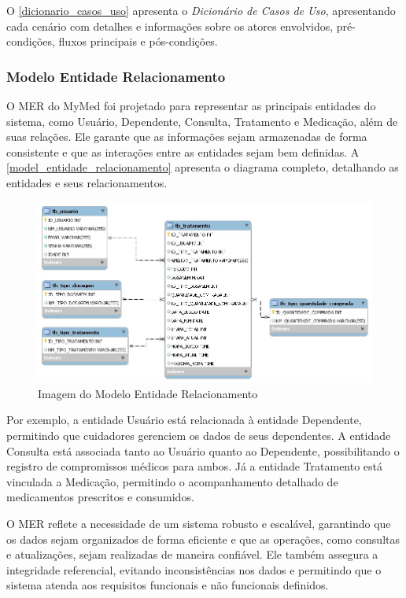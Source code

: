 \documentclass[
	article,			%
	12pt,				%
	oneside,			%
	a4paper,			%
    BIBLATEX,           %
	english,			%
	brazil,				%
	sumario=tradicional
	]{abntex2}
\begin{document}
O \autoref{dicionario_casos_uso} apresenta o \textit{Dicionário de Casos de Uso}, apresentando cada cenário com detalhes e informações sobre os atores envolvidos, pré-condições, fluxos principais e pós-condições.


\subsubsection{Modelo Entidade Relacionamento}

O MER do MyMed foi projetado para representar as principais entidades do sistema, como Usuário, Dependente, Consulta, Tratamento e Medicação, além de suas relações. Ele garante que as informações sejam armazenadas de forma consistente e que as interações entre as entidades sejam bem definidas. A \autoref{model_entidade_relacionamento} apresenta o diagrama completo, detalhando as entidades e seus relacionamentos.

\begin{figure}[!htbp]
    \centering
    \includegraphics[width=1.0\linewidth]{Figuras/bancoDados.jpg}
    \caption{Imagem do Modelo Entidade Relacionamento}
    \label{model_entidade_relacionamento}
\end{figure}

Por exemplo, a entidade Usuário está relacionada à entidade Dependente, permitindo que cuidadores gerenciem os dados de seus dependentes. A entidade Consulta está associada tanto ao Usuário quanto ao Dependente, possibilitando o registro de compromissos médicos para ambos. Já a entidade Tratamento está vinculada a Medicação, permitindo o acompanhamento detalhado de medicamentos prescritos e consumidos.

O MER reflete a necessidade de um sistema robusto e escalável, garantindo que os dados sejam organizados de forma eficiente e que as operações, como consultas e atualizações, sejam realizadas de maneira confiável. Ele também assegura a integridade referencial, evitando inconsistências nos dados e permitindo que o sistema atenda aos requisitos funcionais e não funcionais definidos.
\end{document}
